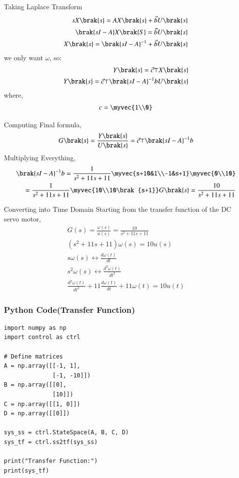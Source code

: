 \documentclass{beamer}
\begin{document}
\begin{frame}{Taking Laplace Transform}
\begin{align}
sX\brak{s}=AX\brak{s}+\vec{b}U\brak{s}\\
    \brak{sI-A}X\brak{S}=\vec{b}U\brak{s}\\
    X\brak{s}=\brak{sI-A}^{-1}+\vec{b}U\brak{s}
\end{align}
we only want $\omega$, so:
\begin{align}
    Y\brak{s}=\vec{c}\top X\brak{s}\\
    Y\brak{s}=\vec{c}\top \brak{sI-A}^{-1}bU\brak{s}
\end{align}
where,
\begin{align}
    c=\myvec{1\\0}
\end{align}
\end{frame}

\begin{frame}{Computing}
Final formula,
\begin{align}
    G\brak{s}=\frac{Y\brak{s}}{U\brak{s}}=\vec{c}\top\brak{sI-A}^{-1}b
\end{align}
Multiplying Everything,
\begin{align}
    \brak{sI-A}^{-1}b=\frac{1}{s^2+11s+11}\myvec{s+10&1\\-1&s+1}\myvec{0\\10}\\
    =\frac{1}{s^2+11s+11}\myvec{10\\10\brak{s+1}}
    G\brak{s}=\frac{10}{s^2+11s+11}\\
\end{align}
\end{frame}

\begin{frame}{Converting into Time Domain}
Starting from the transfer function of the DC servo motor,
\begin{align}
    G(s)=\frac{\omega(s)}{u(s)}=\frac{10}{s^2+11s+11}\\
    (s^2+11s+11)\omega(s)=10u(s)\\
    s\omega(s)\leftrightarrow \frac{d\omega(t)}{dt}\\
    s^2\omega(s)\leftrightarrow \frac{d^2\omega(t)}{dt^2}\\
    \frac{d^2\omega(t)}{dt^2}+11\frac{d\omega(t)}{dt}+11\omega(t)=10u(t)
\end{align}
\end{frame}

\begin{frame}[fragile]
    \frametitle{Python Code(Transfer Function)}
    \begin{lstlisting}
import numpy as np
import control as ctrl

# Define matrices
A = np.array([[-1, 1],
              [-1, -10]])
B = np.array([[0],
              [10]])
C = np.array([[1, 0]])
D = np.array([[0]])

sys_ss = ctrl.StateSpace(A, B, C, D)
sys_tf = ctrl.ss2tf(sys_ss)

print("Transfer Function:")
print(sys_tf)
    \end{lstlisting}
\end{frame}
\end{document}
